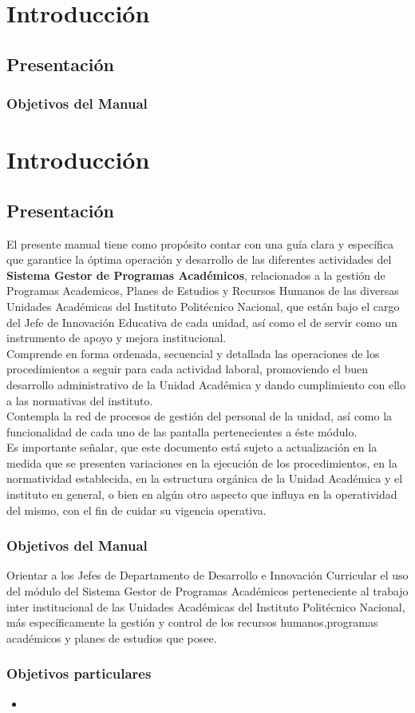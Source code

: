 \chapter{Introducción}
\section{Presentación}
\subsection{Objetivos del Manual}
\chapter{Introducción}
\section{Presentación}
El presente manual tiene como propósito contar con una guía clara y específica que garantice la óptima operación y desarrollo de las diferentes actividades del \textbf{Sistema Gestor de Programas Académicos}, relacionados a la gestión de Programas Academicos, Planes de Estudios y Recursos Humanos de las diversas Unidades Académicas del Instituto Politécnico Nacional, que están bajo el cargo del Jefe de Innovación Educativa de cada unidad, así como el de servir como un instrumento de apoyo y mejora institucional.\\

Comprende en forma ordenada, secuencial y detallada las operaciones de los procedimientos a seguir para cada actividad laboral, promoviendo el buen desarrollo administrativo de la Unidad Académica y dando cumplimiento con ello a las normativas del instituto.\\

Contempla la red de procesos de gestión del personal de la unidad, así como la funcionalidad de cada uno de las pantalla pertenecientes a éste módulo.\\

Es importante señalar, que este documento está sujeto a actualización en la medida que se presenten variaciones en la ejecución de los procedimientos, en la normatividad establecida, en la estructura orgánica de la Unidad Académica y el instituto en general, o bien en algún otro aspecto que influya en la operatividad del mismo, con el fin de cuidar su vigencia operativa.\\

    \subsection{Objetivos del Manual}
     Orientar a los Jefes de Departamento de Desarrollo e Innovación Curricular el uso del módulo del Sistema Gestor de Programas Académicos perteneciente al trabajo inter institucional de las Unidades Académicas del Instituto Politécnico Nacional, más específicamente la gestión y control de los recursos humanos,programas académicos y planes de estudios que posee.
    
    \subsection{Objetivos particulares}
    \begin{itemize}
      \item %
    \end{itemize}
